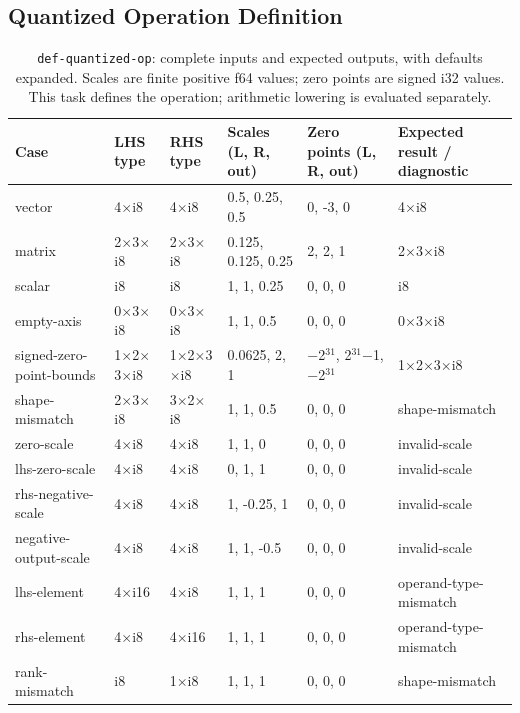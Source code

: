 \subsection{Quantized Operation Definition}
\begin{table}[H]
\caption{\texttt{def-quantized-op}: complete inputs and expected outputs, with
defaults expanded. Scales are finite positive f64 values; zero points are signed
i32 values. This task defines the operation; arithmetic lowering is evaluated separately.}
\label{tab:extension-qadd}
\centering
\scriptsize
\setlength{\tabcolsep}{3pt}
\begin{tabular*}{\textwidth}{@{\extracolsep{\fill}}llllll@{}}
\toprule
Case & LHS type & RHS type & Scales (L, R, out) & Zero points (L, R, out) & Expected result / diagnostic \\
\midrule
vector & 4$\times$i8 & 4$\times$i8 & 0.5, 0.25, 0.5 & 0, -3, 0 & 4$\times$i8 \\
matrix & 2$\times$3$\times$i8 & 2$\times$3$\times$i8 & 0.125, 0.125, 0.25 & 2, 2, 1 & 2$\times$3$\times$i8 \\
scalar & i8 & i8 & 1, 1, 0.25 & 0, 0, 0 & i8 \\
empty-axis & 0$\times$3$\times$i8 & 0$\times$3$\times$i8 & 1, 1, 0.5 & 0, 0, 0 & 0$\times$3$\times$i8 \\
signed-zero-point-bounds & 1$\times$2$\times$3$\times$i8 & 1$\times$2$\times$3$\times$i8 & 0.0625, 2, 1 & $-$2$^{31}$, 2$^{31}$$-$1, $-$2$^{31}$ & 1$\times$2$\times$3$\times$i8 \\
shape-mismatch & 2$\times$3$\times$i8 & 3$\times$2$\times$i8 & 1, 1, 0.5 & 0, 0, 0 & shape-mismatch \\
zero-scale & 4$\times$i8 & 4$\times$i8 & 1, 1, 0 & 0, 0, 0 & invalid-scale \\
lhs-zero-scale & 4$\times$i8 & 4$\times$i8 & 0, 1, 1 & 0, 0, 0 & invalid-scale \\
rhs-negative-scale & 4$\times$i8 & 4$\times$i8 & 1, -0.25, 1 & 0, 0, 0 & invalid-scale \\
negative-output-scale & 4$\times$i8 & 4$\times$i8 & 1, 1, -0.5 & 0, 0, 0 & invalid-scale \\
lhs-element & 4$\times$i16 & 4$\times$i8 & 1, 1, 1 & 0, 0, 0 & operand-type-mismatch \\
rhs-element & 4$\times$i8 & 4$\times$i16 & 1, 1, 1 & 0, 0, 0 & operand-type-mismatch \\
rank-mismatch & i8 & 1$\times$i8 & 1, 1, 1 & 0, 0, 0 & shape-mismatch \\
\bottomrule
\end{tabular*}
\end{table}

